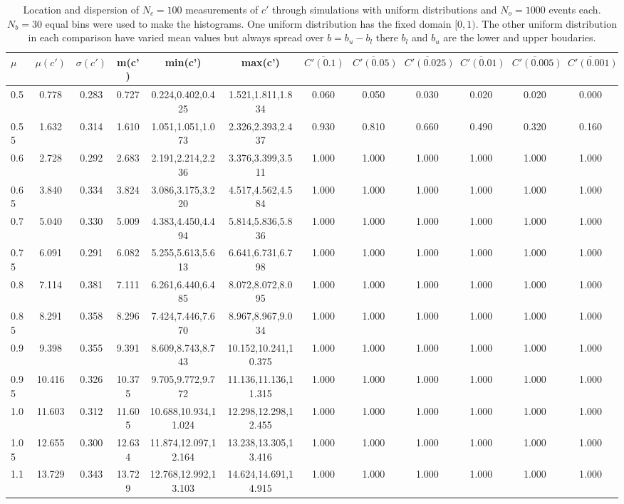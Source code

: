 \begin{table*}[h!]
\begin{center}
\begin{tabular}{| l | c | c | c | c | c | c | c | c | c | c | c |}\hline
$\mu$ & $\mu(c')$ & $\sigma(c')$ & m(c') & min(c') & max(c') & $\overline{C'(0.1)}$ & $\overline{C'(0.05)}$ & $\overline{C'(0.025)}$ & $\overline{C'(0.01)}$ & $\overline{C'(0.005)}$ & $\overline{C'(0.001)}$ \\\hline
0.5 & 0.778 & 0.283 & 0.727 & 0.224,0.402,0.425 & 1.521,1.811,1.834  & 0.060  & 0.050  & 0.030  & 0.020  & 0.020  & 0.000 \\\hline
0.55 & 1.632 & 0.314 & 1.610 & 1.051,1.051,1.073 & 2.326,2.393,2.437  & 0.930  & 0.810  & 0.660  & 0.490  & 0.320  & 0.160 \\\hline
0.6 & 2.728 & 0.292 & 2.683 & 2.191,2.214,2.236 & 3.376,3.399,3.511  & 1.000  & 1.000  & 1.000  & 1.000  & 1.000  & 1.000 \\\hline
0.65 & 3.840 & 0.334 & 3.824 & 3.086,3.175,3.220 & 4.517,4.562,4.584  & 1.000  & 1.000  & 1.000  & 1.000  & 1.000  & 1.000 \\\hline
0.7 & 5.040 & 0.330 & 5.009 & 4.383,4.450,4.494 & 5.814,5.836,5.836  & 1.000  & 1.000  & 1.000  & 1.000  & 1.000  & 1.000 \\\hline
0.75 & 6.091 & 0.291 & 6.082 & 5.255,5.613,5.613 & 6.641,6.731,6.798  & 1.000  & 1.000  & 1.000  & 1.000  & 1.000  & 1.000 \\\hline
0.8 & 7.114 & 0.381 & 7.111 & 6.261,6.440,6.485 & 8.072,8.072,8.095  & 1.000  & 1.000  & 1.000  & 1.000  & 1.000  & 1.000 \\\hline
0.85 & 8.291 & 0.358 & 8.296 & 7.424,7.446,7.670 & 8.967,8.967,9.034  & 1.000  & 1.000  & 1.000  & 1.000  & 1.000  & 1.000 \\\hline
0.9 & 9.398 & 0.355 & 9.391 & 8.609,8.743,8.743 & 10.152,10.241,10.375  & 1.000  & 1.000  & 1.000  & 1.000  & 1.000  & 1.000 \\\hline
0.95 & 10.416 & 0.326 & 10.375 & 9.705,9.772,9.772 & 11.136,11.136,11.315  & 1.000  & 1.000  & 1.000  & 1.000  & 1.000  & 1.000 \\\hline
1.0 & 11.603 & 0.312 & 11.605 & 10.688,10.934,11.024 & 12.298,12.298,12.455  & 1.000  & 1.000  & 1.000  & 1.000  & 1.000  & 1.000 \\\hline
1.05 & 12.655 & 0.300 & 12.634 & 11.874,12.097,12.164 & 13.238,13.305,13.416  & 1.000  & 1.000  & 1.000  & 1.000  & 1.000  & 1.000 \\\hline
1.1 & 13.729 & 0.343 & 13.729 & 12.768,12.992,13.103 & 14.624,14.691,14.915  & 1.000  & 1.000  & 1.000  & 1.000  & 1.000  & 1.000 \\\hline
\end{tabular}
\caption{Location and dispersion of $N_c=100$
measurements of $c'$ through simulations
with uniform distributions and $N_o=1000$ events each.
$N_b=30$ equal bins were used to make the histograms.
One uniform distribution has the fixed domain $[0,1)$.
The other uniform distribution in each comparison
have varied mean values but always
spread over $b=b_u-b_l$ there $b_l$ and $b_u$ are the lower and upper boudaries.}
\end{center}
\end{table*}